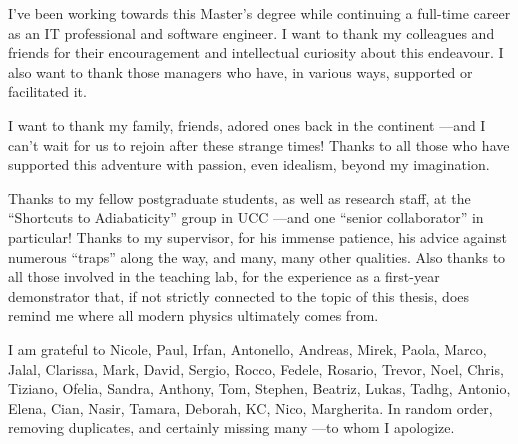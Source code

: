 I've been working towards this Master's degree 
while continuing a full-time career as an IT professional and software engineer. 
I want to thank my colleagues and friends 
for their encouragement and intellectual curiosity about this endeavour. 
I also want to thank those managers who have, 
in various ways, 
supported or facilitated it.

I want to thank my family, friends, adored ones back in the continent
---and I can’t wait for us to rejoin after these strange times!
Thanks to all those who have supported this adventure with passion, even idealism, beyond my imagination.

Thanks to  my fellow postgraduate students, as well as research staff, at the
“Shortcuts to Adiabaticity” group in UCC ---and one ``senior collaborator'' in particular! 
Thanks to my supervisor, for his immense patience, his advice against numerous “traps” along the way, 
and many, many other qualities. 
Also thanks to all those involved in the teaching lab, 
for the experience as a first-year demonstrator that, 
if not strictly connected to the topic of this thesis, 
does remind me where all modern physics ultimately comes from.

I am grateful to Nicole, Paul, Irfan, Antonello, Andreas, Mirek, Paola, Marco,
Jalal, Clarissa, Mark, David, Sergio, Rocco, Fedele, Rosario, Trevor, Noel, Chris, Tiziano, Ofelia,
Sandra, Anthony, Tom, Stephen, Beatriz, Lukas, Tadhg, Antonio, Elena, Cian, Nasir, Tamara, 
Deborah, KC, Nico, Margherita. 
In random order, removing duplicates, and certainly missing many ---to whom I apologize.

